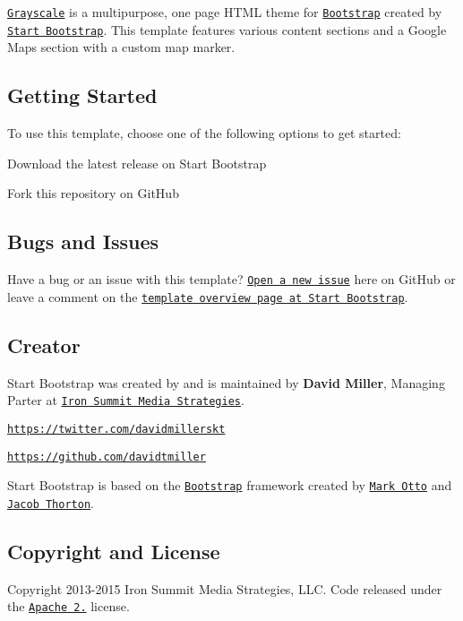 \href{http://startbootstrap.com/template-overviews/grayscale/}{\tt Grayscale} is a multipurpose, one page H\+T\+M\+L theme for \href{http://getbootstrap.com/}{\tt Bootstrap} created by \href{http://startbootstrap.com/}{\tt Start Bootstrap}. This template features various content sections and a Google Maps section with a custom map marker.

\subsection*{Getting Started}

To use this template, choose one of the following options to get started\+:
\begin{DoxyItemize}
\item Download the latest release on Start Bootstrap
\item Fork this repository on Git\+Hub
\end{DoxyItemize}

\subsection*{Bugs and Issues}

Have a bug or an issue with this template? \href{https://github.com/IronSummitMedia/startbootstrap-grayscale/issues}{\tt Open a new issue} here on Git\+Hub or leave a comment on the \href{http://startbootstrap.com/template-overviews/grayscale/}{\tt template overview page at Start Bootstrap}.

\subsection*{Creator}

Start Bootstrap was created by and is maintained by {\bfseries David Miller}, Managing Parter at \href{http://www.ironsummitmedia.com/}{\tt Iron Summit Media Strategies}.


\begin{DoxyItemize}
\item \href{https://twitter.com/davidmillerskt}{\tt https\+://twitter.\+com/davidmillerskt}
\item \href{https://github.com/davidtmiller}{\tt https\+://github.\+com/davidtmiller}
\end{DoxyItemize}

Start Bootstrap is based on the \href{http://getbootstrap.com/}{\tt Bootstrap} framework created by \href{https://twitter.com/mdo}{\tt Mark Otto} and \href{https://twitter.com/fat}{\tt Jacob Thorton}.

\subsection*{Copyright and License}

Copyright 2013-\/2015 Iron Summit Media Strategies, L\+L\+C. Code released under the \href{https://github.com/IronSummitMedia/startbootstrap-grayscale/blob/gh-pages/LICENSE}{\tt Apache 2.} license. 